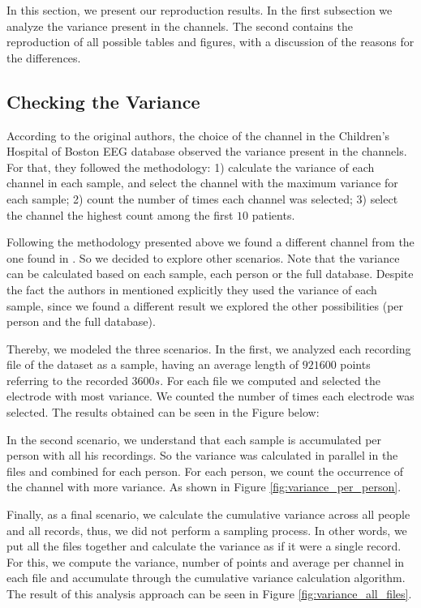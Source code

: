 In this section, we present our reproduction results. In the first subsection we analyze the variance present in the channels. The second contains the reproduction of all possible tables and figures, with a discussion of the reasons for the differences. 

\subsection{Checking the Variance} 

According to the original authors, the choice of the channel in the Children's Hospital of Boston EEG database observed the variance present in the channels. For that, they followed the methodology: 1) calculate the variance of each channel in each sample, and select the channel with the maximum variance for each sample; 2) count the number of times each channel was selected; 3) select the channel the highest count among the first $10$ patients.

Following the methodology presented above we found a different channel from the one found in \cite{WenZha:2018}. So we decided to explore other scenarios. Note that the variance can be calculated based on each sample, each person or the full database. Despite the fact the authors in \cite{WenZha:2018} mentioned explicitly they used the variance of each sample, since we found a different result we explored the other possibilities (per person and the full database).

Thereby, we modeled the three scenarios. In the first, we analyzed each recording file of the dataset as a sample, having an average length of $921600$ points referring to the recorded $3600s$. For each file we computed and selected the electrode with most variance. We counted the number of times each electrode was selected. The results obtained can be seen in the Figure below:

In the second scenario, we understand that each sample is accumulated per person with all his recordings. So the variance was calculated in parallel in the files and combined for each person. For each person, we count the occurrence of the channel with more variance. As shown in Figure \ref{fig:variance_per_person}.

Finally, as a final scenario, we calculate the cumulative variance across all people and all records, thus, we did not perform a sampling process. In other words, we put all the files together and calculate the variance as if it were a single record. For this, we compute the variance, number of points and average per channel in each file and accumulate through the cumulative variance calculation algorithm. The result of this analysis approach can be seen in Figure \ref{fig:variance_all_files}.



